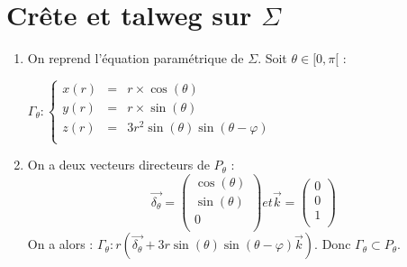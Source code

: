 \section{Crête et talweg sur $\Sigma$}
\begin{enumerate}
  \item On reprend l'équation paramétrique de $\Sigma$. Soit $\theta\in[0,\pi[$ :
        \begin{result}
          $
            \Gamma_\theta :
            \left\{
            \begin{array}{rcl}
              x(r) & = & r \times \cos{(\theta)}                       \\
              y(r) & = & r \times \sin{(\theta)}                       \\
              z(r) & = & 3r^{2} \sin{(\theta)}\sin{(\theta - \varphi)} \\
            \end{array}
            \right.
          $
        \end{result}
  \item
        On a deux vecteurs directeurs de $P_\theta$ :
        \[
          \overrightarrow{\delta_\theta} =
          \left(
          \begin{array}{c}
              \cos{(\theta)} \\
              \sin{(\theta)} \\
              0              \\
            \end{array}
          \right) et \overrightarrow{k} =
          \left(
          \begin{array}{c}
              0 \\
              0 \\
              1 \\
            \end{array}
          \right)
        \] On a alors : $\Gamma_\theta : r(\overrightarrow{\delta_\theta} + 3r\sin{(\theta)}\sin{(\theta - \varphi)}\overrightarrow{k})$. Donc $\Gamma_\theta \subset P_\theta$.


\end{enumerate}
